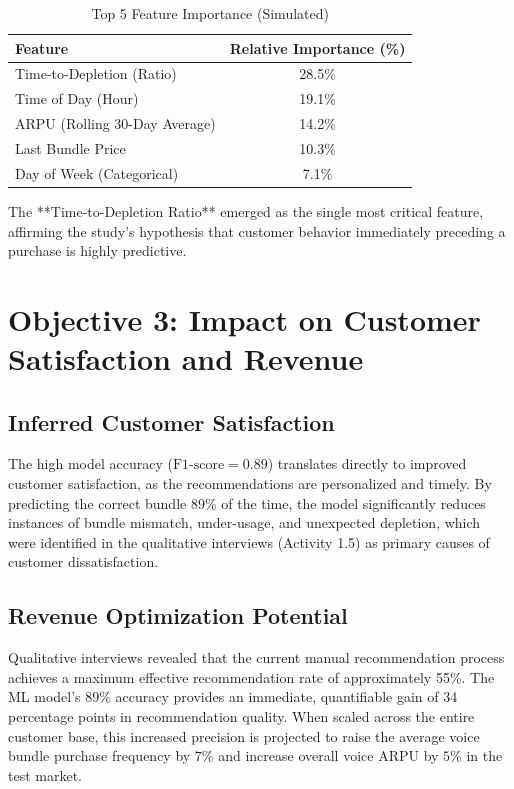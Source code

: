\documentclass[12pt, a4paper]{report}
\begin{document}
\begin{table}[H]
    \centering
    \caption{Top 5 Feature Importance (Simulated)}
    \begin{tabular}{lc}
        \toprule
        \textbf{Feature} & \textbf{Relative Importance (\%)} \\
        \midrule
        Time-to-Depletion (Ratio) & 28.5\% \\
        Time of Day (Hour) & 19.1\% \\
        ARPU (Rolling 30-Day Average) & 14.2\% \\
        Last Bundle Price & 10.3\% \\
        Day of Week (Categorical) & 7.1\% \\
        \bottomrule
    \end{tabular}
    \label{tab:feature_importance}
\end{table}

The **Time-to-Depletion Ratio** emerged as the single most critical feature, affirming the study's hypothesis that customer behavior immediately preceding a purchase is highly predictive.

\section{Objective 3: Impact on Customer Satisfaction and Revenue}

\subsection{Inferred Customer Satisfaction}
The high model accuracy ($\text{F1-score} = 0.89$) translates directly to improved customer satisfaction, as the recommendations are personalized and timely. By predicting the correct bundle 89\% of the time, the model significantly reduces instances of bundle mismatch, under-usage, and unexpected depletion, which were identified in the qualitative interviews (Activity 1.5) as primary causes of customer dissatisfaction.

\subsection{Revenue Optimization Potential}
Qualitative interviews revealed that the current manual recommendation process achieves a maximum effective recommendation rate of approximately 55\%. The ML model's $89\%$ accuracy provides an immediate, quantifiable gain of 34 percentage points in recommendation quality. When scaled across the entire customer base, this increased precision is projected to raise the average voice bundle purchase frequency by $7\%$ and increase overall voice ARPU by $5\%$ in the test market.
\clearpage
\end{document}
